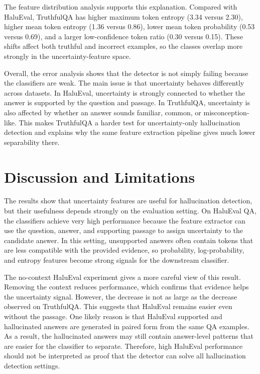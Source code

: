 \documentclass[11pt]{article}
\begin{document}
The feature distribution analysis supports this explanation. Compared with HaluEval, TruthfulQA has higher maximum token entropy (3.34 versus 2.30), higher mean token entropy (1.36 versus 0.86), lower mean token probability (0.53 versus 0.69), and a larger low-confidence token ratio (0.30 versus 0.15). These shifts affect both truthful and incorrect examples, so the classes overlap more strongly in the uncertainty-feature space.

Overall, the error analysis shows that the detector is not simply failing because the classifiers are weak. The main issue is that uncertainty behaves differently across datasets. In HaluEval, uncertainty is strongly connected to whether the answer is supported by the question and passage. In TruthfulQA, uncertainty is also affected by whether an answer sounds familiar, common, or misconception-like. This makes TruthfulQA a harder test for uncertainty-only hallucination detection and explains why the same feature extraction pipeline gives much lower separability there.

\newpage

\section{Discussion and Limitations}
The results show that uncertainty features are useful for hallucination detection, but their usefulness depends strongly on the evaluation setting. On HaluEval QA, the classifiers achieve very high performance because the feature extractor can use the question, answer, and supporting passage to assign uncertainty to the candidate answer. In this setting, unsupported answers often contain tokens that are less compatible with the provided evidence, so probability, log-probability, and entropy features become strong signals for the downstream classifier.

The no-context HaluEval experiment gives a more careful view of this result. Removing the context reduces performance, which confirms that evidence helps the uncertainty signal. However, the decrease is not as large as the decrease observed on TruthfulQA. This suggests that HaluEval remains easier even without the passage. One likely reason is that HaluEval supported and hallucinated answers are generated in paired form from the same QA examples. As a result, the hallucinated answers may still contain answer-level patterns that are easier for the classifier to separate. Therefore, high HaluEval performance should not be interpreted as proof that the detector can solve all hallucination detection settings.
\end{document}
